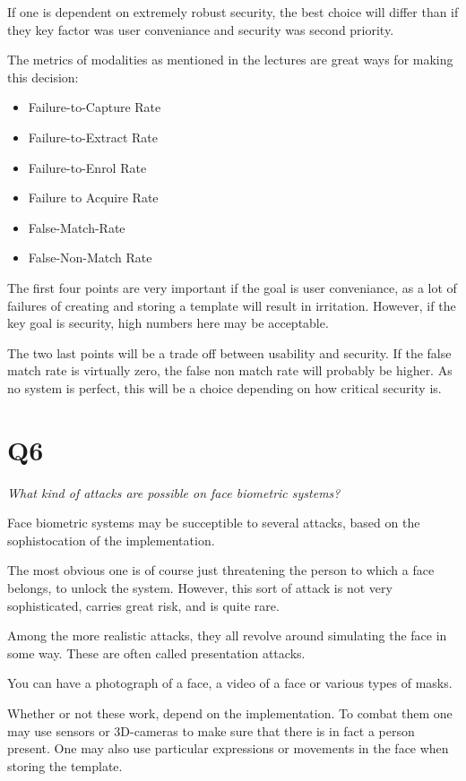 \documentclass{article}
\begin{document}
If one is dependent on extremely robust security, the best choice will differ than if they key factor was user conveniance and security was second priority.

The metrics of modalities as mentioned in the lectures are great ways for making this decision:

\begin{itemize}
  \item{Failure-to-Capture Rate}
  \item{Failure-to-Extract Rate}
  \item{Failure-to-Enrol Rate}
  \item{Failure to Acquire Rate}
  \item{False-Match-Rate}
  \item{False-Non-Match Rate}
\end{itemize}
The first four points are very important if the goal is user conveniance, as a lot of failures of creating and storing a template will result in irritation. However, if the key goal is security, high numbers here may be acceptable.

The two last points will be a trade off between usability and security. If the false match rate is virtually zero, the false non match rate will probably be higher. As no system is perfect, this will be a choice depending on how critical security is.


\newpage
\section{Q6}
\begin{tcolorbox}
  \textit{What kind of attacks are possible on face biometric systems?}
\end{tcolorbox}

Face biometric systems may be succeptible to several attacks, based on the sophistocation of the implementation.

The most obvious one is of course just threatening the person to which a face belongs, to unlock the system. However, this sort of attack is not very sophisticated, carries great risk, and is quite rare.

Among the more realistic attacks, they all revolve around simulating the face in some way. These are often called presentation attacks.

You can have a photograph of a face, a video of a face or various types of masks.

Whether or not these work, depend on the implementation. To combat them one may use sensors or 3D-cameras to make sure that there is in fact a person present. One may also use particular expressions or movements in the face when storing the template.
\end{document}
